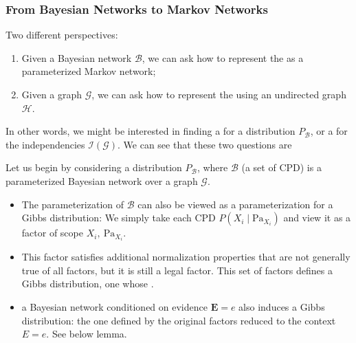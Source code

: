 \documentclass{article}
\begin{document}
\subsubsection{From Bayesian Networks to Markov Networks}\label{sec:qmadfd}
Two different perspectives: 
\begin{enumerate}
    \item Given a Bayesian network $\mathcal{B}$, we can ask how to represent the  as a parameterized Markov network; 
    \item Given a graph $\mathcal{G}$, we can ask how to represent the  using an undirected graph $\mathcal{H}$.
\end{enumerate}
\begin{rema}
 In other words, we might be interested in finding a  for a distribution $P_{\mathcal{B}}$, or a  for the independencies $\mathcal{I}(\mathcal{G})$. We can see that these two questions are  
\end{rema}
 
 
Let us begin by considering a distribution $P_{\mathcal{B}}$, where $\mathcal{B}$ (a set of CPD) is a parameterized Bayesian network over a graph $\mathcal{G}$. 
\begin{itemize}
    \item {} The parameterization of $\mathcal{B}$ can also be viewed as a parameterization for a Gibbs distribution: We simply take each CPD $P\left(X_{i} \mid \mathrm{Pa}_{X_{i}}\right)$ and view it as a factor of scope $X_{i}, \mathrm{~Pa}_{X_{i}}$. 
    \item {} This factor satisfies additional normalization properties that are not generally true of all factors, but it is still a legal factor. This set of factors defines a Gibbs distribution, one whose .
    \item {} a Bayesian network conditioned on evidence $\boldsymbol{E}=e$ also induces a Gibbs distribution: the one defined by the original factors reduced to the context $E=e$. See below lemma.
\end{itemize}
\end{document}
